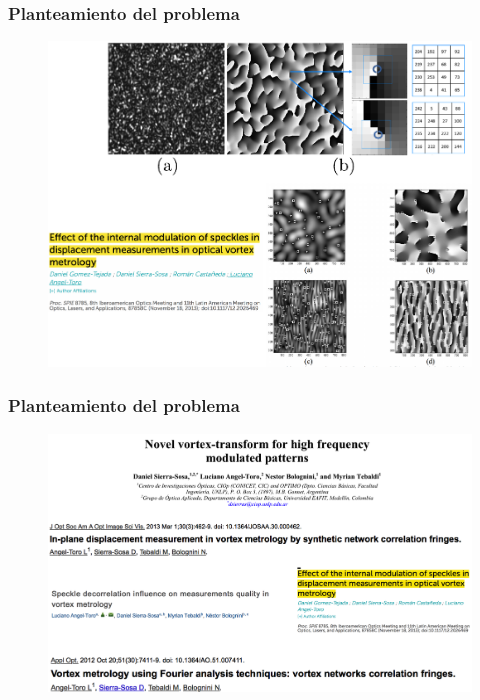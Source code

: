 \documentclass[xcolor=table,serif]{beamer}
\begin{document}
\begin{frame}
\frametitle{Planteamiento del problema}
\begin{figure}
  \includegraphics[scale = 0.6]{Figures/presentation/speckle_vo_2.pdf}
  \end{figure}
\end{frame}
\addtocounter{framenumber}{-1}
\begin{frame}
\frametitle{Planteamiento del problema}
\begin{figure}
  \includegraphics[scale = 0.45]{Figures/presentation/metrologia.png}
  \end{figure}
\end{frame}
\end{document}
